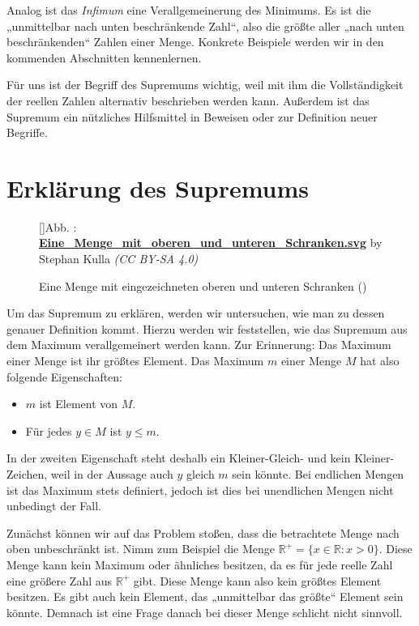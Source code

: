 \documentclass[fontsize=9pt,
               parskip=half-,
               DIV=14,
               listof=chapterentry,
               tocflat]{scrbook}
\newcounter{imagelabel}
\begin{document}
Analog ist das \emph{Infimum} eine Verallgemeinerung des Minimums. Es ist die „unmittelbar nach unten beschränkende Zahl“, also die größte aller „nach unten beschränkenden“ Zahlen einer Menge. Konkrete Beispiele werden wir in den kommenden Abschnitten kennenlernen.

Für uns ist der Begriff des Supremums wichtig, weil mit ihm die Vollständigkeit der reellen Zahlen alternativ beschrieben werden kann. Außerdem ist das Supremum ein nützliches Hilfsmittel in Beweisen oder zur Definition neuer Begriffe.

\section{Erklärung des Supremums}

\begin{figure}[h]
\vspace{\baselineskip}
[]{Abb. : \protect\href{https://commons.wikimedia.org/wiki/File:Eine_Menge_mit_oberen_und_unteren_Schranken.svg}{\textbf{Eine\allowbreak\_Menge\allowbreak\_mit\allowbreak\_oberen\allowbreak\_und\allowbreak\_unteren\allowbreak\_Schranken.svg}} by Stephan Kulla \textit{(CC BY-SA 4.0)}}\centering
{}
\caption*{Eine Menge mit eingezeichneten oberen und unteren Schranken ()}
\end{figure}
Um das Supremum zu erklären, werden wir untersuchen, wie man zu dessen genauer Definition kommt. Hierzu werden wir feststellen, wie das Supremum aus dem Maximum verallgemeinert werden kann. Zur Erinnerung: Das Maximum einer Menge ist ihr größtes Element. Das Maximum $m$ einer Menge $M$ hat also folgende Eigenschaften:

\begin{itemize}
\item $m$ ist Element von $M$.
\item Für jedes $y\in M$ ist $y\leq m$.
\end{itemize}

In der zweiten Eigenschaft steht deshalb ein Kleiner-Gleich- und kein Kleiner-Zeichen, weil in der Aussage auch $y$ gleich $m$ sein könnte. Bei endlichen Mengen ist das Maximum stets definiert, jedoch ist dies bei unendlichen Mengen nicht unbedingt der Fall.

Zunächst können wir auf das Problem stoßen, dass die betrachtete Menge nach oben unbeschränkt ist. Nimm zum Beispiel die Menge $\mathbb {R} ^{+}=\{x\in \mathbb {R} :x>0\}$. Diese Menge kann kein Maximum oder ähnliches besitzen, da es für jede reelle Zahl eine größere Zahl aus $\mathbb {R} ^{+}$ gibt. Diese Menge kann also kein größtes Element besitzen. Es gibt auch kein Element, das „unmittelbar das größte“ Element sein könnte. Demnach ist eine Frage danach bei dieser Menge schlicht nicht sinnvoll.
\end{document}
